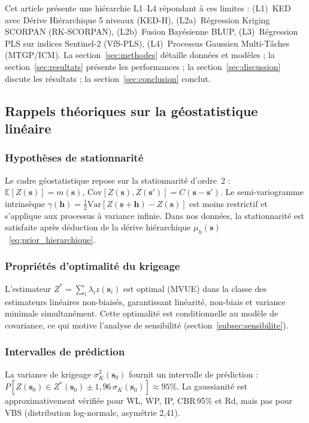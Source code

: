 \documentclass[10pt,a4paper,twocolumn]{article}
\newcommand{\bs}{\mathbf{s}}
\begin{document}
Cet article présente une hiérarchie L1--L4 répondant à ces limites :
(L1)~KED avec Dérive Hiérarchique 5 niveaux (KED-H),
(L2a)~Régression Kriging SCORPAN (RK-SCORPAN),
(L2b)~Fusion Bayésienne BLUP,
(L3)~Régression PLS sur indices Sentinel-2 (VfS-PLS),
(L4)~Processus Gaussien Multi-Tâches (MTGP/ICM).
La section~\ref{sec:methodes} détaille données et modèles ;
la section~\ref{sec:resultats} présente les performances ;
la section~\ref{sec:discussion} discute les résultats ;
la section~\ref{sec:conclusion} conclut.

\subsection{Rappels théoriques sur la géostatistique linéaire}
\label{sec:theorie}

\subsubsection{Hypothèses de stationnarité}

Le cadre géostatistique repose sur la stationnarité d'ordre~2 :
$\mathbb{E}[Z(\bs)] = m(\bs)$,
$\mathrm{Cov}[Z(\bs), Z(\bs')] = C(\bs - \bs')$.
Le semi-variogramme intrinsèque
$\gamma(\mathbf{h}) = \frac{1}{2}\mathrm{Var}[Z(\bs+\mathbf{h})-Z(\bs)]$
est moins restrictif et s'applique aux processus à variance infinie.
Dans nos données, la stationnarité est satisfaite après déduction de la dérive
hiérarchique $\mu_h(\bs)$~\eqref{eq:prior_hierarchique}.

\subsubsection{Propriétés d'optimalité du krigeage}

L'estimateur $Z^* = \sum_i \lambda_i z(\bs_i)$ est optimal (MVUE) dans la
classe des estimateurs linéaires non-biaisés, garantissant
linéarité, non-biais et variance minimale simultanément.
Cette optimalité est conditionnelle au modèle de covariance, ce qui motive
l'analyse de sensibilité (section~\ref{subsec:sensibilite}).

\subsubsection{Intervalles de prédiction}

La variance de krigeage $\sigma^2_K(\bs_0)$ fournit un intervalle de prédiction :
$P[Z(\bs_0) \in Z^*(\bs_0) \pm 1{,}96\,\sigma_K(\bs_0)] \approx 95\%$.
La gaussianité est approximativement vérifiée pour WL, WP, IP, CBR\,95\% et Rd,
mais pas pour VBS (distribution log-normale, asymétrie 2{,}41).
\end{document}
